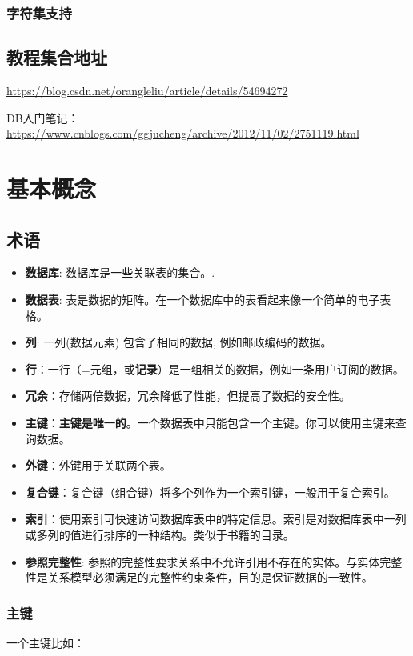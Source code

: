 \documentclass[UTF8,a4paper,12pt]{ctexbook}
\begin{document}
	 	\subsection{字符集支持}
		
		
	 \section{教程集合地址}
	 	\url{https://blog.csdn.net/orangleliu/article/details/54694272}
	 	
	 	DB入门笔记：\url{https://www.cnblogs.com/ggjucheng/archive/2012/11/02/2751119.html}
	 	
	 	
	 	
\chapter{基本概念}
	 \section{术语}
		 \begin{itemize}
		 	\item  \textbf{数据库}: 数据库是一些关联表的集合。.
		 	\item  \textbf{数据表}: 表是数据的矩阵。在一个数据库中的表看起来像一个简单的电子表格。
		 	\item  \textbf{列}: 一列(数据元素) 包含了相同的数据, 例如邮政编码的数据。
		 	\item  \textbf{行}：一行（=元组，或\textbf{记录}）是一组相关的数据，例如一条用户订阅的数据。
		 	\item  \textbf{冗余}：存储两倍数据，冗余降低了性能，但提高了数据的安全性。
		 	\item  \textbf{主键}：\textbf{主键是唯一的}。一个数据表中只能包含一个主键。你可以使用主键来查询数据。
		 	\item  \textbf{外键}：外键用于关联两个表。
		 	\item  \textbf{复合键}：复合键（组合键）将多个列作为一个索引键，一般用于复合索引。
		 	\item  \textbf{索引}：使用索引可快速访问数据库表中的特定信息。索引是对数据库表中一列或多列的值进行排序的一种结构。类似于书籍的目录。
		 	\item  \textbf{参照完整性}: 参照的完整性要求关系中不允许引用不存在的实体。与实体完整性是关系模型必须满足的完整性约束条件，目的是保证数据的一致性。
		 \end{itemize}
		
		\subsection{主键}
			一个主键比如：
			 
\end{document}
